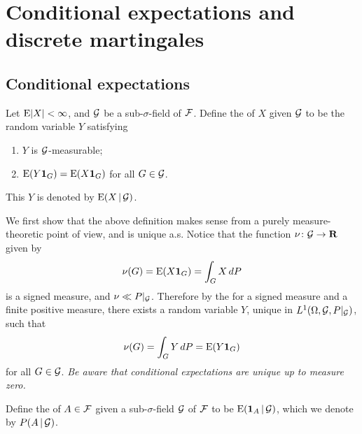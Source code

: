 \chapter{Conditional expectations and discrete martingales}
\section{Conditional expectations}
\begin{defn} \label{def:cond-expec}
    Let $\mathop{}\!\mathrm{E} \lvert X \rvert < \infty$, and $\mathcal{G}$ be a sub-$\sigma$-field of $\mathcal{F}$. Define the  of $X$ given $\mathcal{G}$ to be the random variable $Y$ satisfying \begin{enumerate}
        \item $Y$ is $\mathcal{G}$-measurable; 
        \item \label{enu:equal-int-cond-expec} $\mathop{}\!\mathrm{E}(Y \mathbf{1}_{G}) = \mathop{}\!\mathrm{E}(X \mathbf{1}_G)$ for all $G \in \mathcal{G}$.
    \end{enumerate}
    This $Y$ is denoted by $\mathop{}\!\mathrm{E}(X \,|\, \mathcal{G})$.
\end{defn}

We first show that the above definition makes sense from a purely measure-theoretic point of view, and is unique a.s.
Notice that the function $\nu\colon \mathcal{G} \to \mathbf{R}$ given by \begin{equation} \label{eq:cond-expec-signed-meas}
    \nu(G) = \E(X\ind_G) = \int_G X \,dP
\end{equation} is a signed measure, and $\nu \ll P|_{\mathcal{G}}$. Therefore by the  for a signed measure and a finite positive measure, there exists a random variable $Y$, unique in $L^1(\Omega,\mathcal{G},P|_{\mathcal{G}})$, such that \[
    \nu(G) = \int_G Y \,dP = \mathop{}\!\mathrm{E}(Y\mathbf{1}_G)
\] for all $G\in \mathcal{G}$. \emph{Be aware that conditional expectations are unique up to measure zero.}


\begin{defn}
    Define the  of $A \in \mathcal{F}$ given a sub-$\sigma$-field $\mathcal{G}$ of $\mathcal{F}$ to be $\mathop{}\!\mathrm{E}(\mathbf{1}_A \,|\, \mathcal{G})$, which we denote by $P(A\,|\, \mathcal{G})$.
\end{defn}

